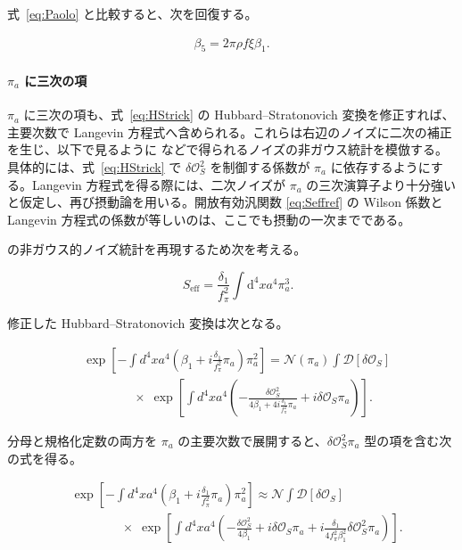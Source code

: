 \documentclass[a4paper,11pt]{ltjsarticle}
\numberwithin{equation}{section}
\def\pia{\pi_{a}}
\newcommand{\Os}{\delta \mathcal{O}_{S}}
\newcommand{\dd}{\mathrm{d}}
\newcommand{\Eq}[1]{Eq.~(\ref{#1})}
\renewcommand{\Eq}[1]{式~\eqref{#1}}
\begin{document}
\Eq{eq:Paolo} と比較すると、次を回復する。

\begin{align}
\beta_5 = 2\pi\rho f\xi \beta_1.
\end{align}

\paragraph{$\pia$ に三次の項} $\pia$ に三次の項も、\Eq{eq:HStrick} の Hubbard--Stratonovich 変換を修正すれば、主要次数で Langevin 方程式へ含められる。これらは右辺のノイズに二次の補正を生じ、以下で見るように \cite{Creminelli:2023aly} などで得られるノイズの非ガウス統計を模倣する。具体的には、\Eq{eq:HStrick} で $\Os^2$ を制御する係数が $\pia$ に依存するようにする。Langevin 方程式を得る際には、二次ノイズが $\pia$ の三次演算子より十分強いと仮定し、再び摂動論を用いる。開放有効汎関数 \eqref{eq:Seffref} の Wilson 係数と Langevin 方程式の係数が等しいのは、ここでも摂動の一次までである。

\cite{Creminelli:2023aly} の非ガウス的ノイズ統計を再現するため次を考える。

\begin{equation}
\quad S_{\mathrm{eff}} = \frac{\delta_1}{f_\pi^2} \int \dd^4 x  a^4 \pia^3.
\end{equation}

修正した Hubbard--Stratonovich 変換は次となる。

\begin{align}
&\exp\left[-\int d^{4}x a^{4}\left(\beta_{1}+i \frac{\delta_1}{f_\pi^2}\pia\right)\pia^{2}\right]=\mathcal{N}(\pia)\int\mathcal{D}[\Os] \\
& \qquad \qquad \times \;\exp\left[\int d^{4}x a^{4}\left(-\frac{\Os^{2}}{4\beta_{1}+4i \frac{\delta_1}{f_\pi^2}\pia}+i\Os\pia\right)\right].\nonumber
\end{align}

分母と規格化定数の両方を $\pia$ の主要次数で展開すると、$\Os^2\pia$ 型の項を含む次の式を得る。

\begin{align}
&\exp\left[-\int d^{4}x a^{4}\left(\beta_{1}+i \frac{\delta_1}{f_\pi^2}\pia\right)\pia^{2}\right]\approx\mathcal{N}\int\mathcal{D}[\Os] \\
&\qquad \qquad \times \;\exp\left[\int d^{4}x a^{4}\left(-\frac{\Os^{2}}{4\beta_{1}} + i\Os\pia + i\frac{\delta_{1}}{4f_\pi^2\beta_{1}^{2}} \Os^2 \pia\right) \right]. \nonumber 
\end{align}
\end{document}
